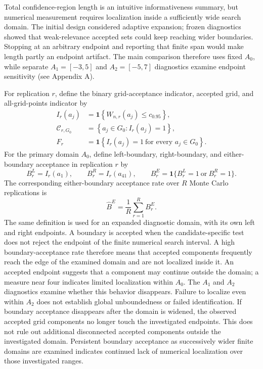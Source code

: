Total confidence-region length is an intuitive informativeness summary, but numerical measurement requires localization inside a sufficiently wide search domain. The initial design considered adaptive expansion; frozen diagnostics showed that weak-relevance accepted sets could keep reaching wider boundaries. Stopping at an arbitrary endpoint and reporting that finite span would make length partly an endpoint artifact. The main comparison therefore uses fixed $A_0$, while separate $A_1=[-3,5]$ and $A_2=[-5,7]$ diagnostics examine endpoint sensitivity (see Appendix A).

For replication $r$, define the binary grid-acceptance indicator, accepted grid, and all-grid-points indicator by
\begin{equation}
  \begin{aligned}
    I_r(a_j)
      &=\mathbf{1}\!\left\{W_{n,r}(a_j)\leq c_{0.95}\right\}, \\
    \mathcal{C}_{r,G_0}
      &=\left\{a_j\in G_0:I_r(a_j)=1\right\}, \\
    F_r
      &=\mathbf{1}\!\left\{I_r(a_j)=1\ \text{for every }a_j\in G_0\right\}.
  \end{aligned}
  \label{eq:grid-acceptance}
\end{equation}
For the primary domain $A_0$, define left-boundary, right-boundary, and either-boundary acceptance in replication $r$ by
\begin{equation}
  B_r^{L}=I_r(a_1),\qquad
  B_r^{R}=I_r(a_{41}),\qquad
  B_r^{E}=\mathbf{1}\{B_r^{L}=1\ \text{or}\ B_r^{R}=1\}.
  \label{eq:boundary-acceptance}
\end{equation}
The corresponding either-boundary acceptance rate over $R$ Monte Carlo replications is
\begin{equation}
  \widehat B^{E}
  =\frac{1}{R}\sum_{r=1}^{R}B_r^{E}.
  \label{eq:boundary-acceptance-rate}
\end{equation}
The same definition is used for an expanded diagnostic domain, with its own left and right endpoints. A boundary is accepted when the candidate-specific test does not reject the endpoint of the finite numerical search interval. A high boundary-acceptance rate therefore means that accepted components frequently reach the edge of the examined domain and are not localized inside it. An accepted endpoint suggests that a component may continue outside the domain; a measure near four indicates limited localization within $A_0$. The $A_1$ and $A_2$ diagnostics examine whether this behavior disappears. Failure to localize even within $A_2$ does not establish global unboundedness or failed identification. If boundary acceptance disappears after the domain is widened, the observed accepted grid components no longer touch the investigated endpoints. This does not rule out additional disconnected accepted components outside the investigated domain. Persistent boundary acceptance as successively wider finite domains are examined indicates continued lack of numerical localization over those investigated ranges.

